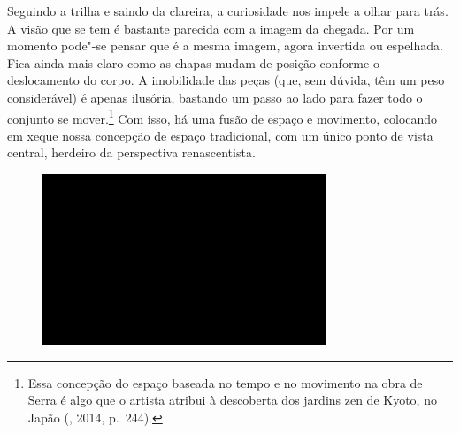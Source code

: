 Seguindo a trilha e saindo da clareira, a curiosidade nos impele a olhar
para trás. A visão que se tem é bastante parecida com a imagem da
chegada. Por um momento pode"-se pensar que é a mesma imagem, agora
invertida ou espelhada. Fica ainda mais claro como as chapas mudam de
posição conforme o deslocamento do corpo. A imobilidade das peças (que,
sem dúvida, têm um peso considerável) é apenas ilusória, bastando um
passo ao lado para fazer todo o conjunto se mover.\footnote{Essa concepção do
  espaço baseada no tempo e no movimento na obra de Serra é algo que o
  artista atribui à descoberta dos jardins zen de Kyoto, no Japão
  (, 2014, p.~244).} Com isso, há uma fusão de espaço e movimento,
colocando em xeque nossa concepção de espaço tradicional, com um único
ponto de vista central, herdeiro da perspectiva renascentista.

\begin{figure}[!ht]

\centering
 \includegraphics[width=85mm]{./imgs/im1.jpg}
\caption{\tiny{}}

\end{figure}

